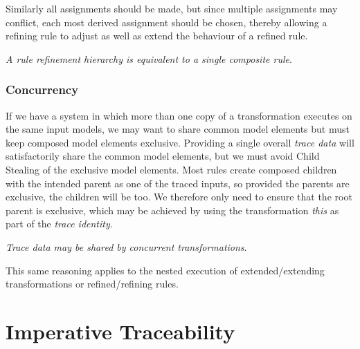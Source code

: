\documentclass[runningheads,a4paper]{llncs}
\begin{document}
Similarly all assignments should be made, but since multiple assignments may conflict, each most derived assignment should be chosen, thereby allowing a refining rule to adjust as well as extend the behaviour of a refined rule.

\emph{A rule refinement hierarchy is equivalent to a single composite rule}.



\subsubsection{Concurrency}

If we have a system in which more than one copy of a transformation executes on the same input models, we may want to share common model elements but must keep composed model elements exclusive. Providing a single overall \emph{trace data} will satisfactorily share the common model elements, but we must avoid Child Stealing of the exclusive model elements. Most rules create composed children with the intended parent as one of the traced inputs, so provided the parents are exclusive, the children will be too. We therefore only need to ensure that the root parent is exclusive, which may be achieved by using the transformation \emph{this} as part of the \emph{trace identity}.

 \emph{Trace data may be shared by concurrent transformations}.
 
This same reasoning applies to the nested execution of extended/extending transformations or refined/refining rules.

\section{Imperative Traceability}\label{imperative}
\end{document}
